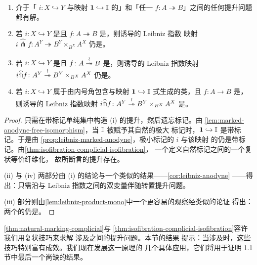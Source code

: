 \begin{proposition}\label{prop:leibniz-stability-isofibrations}
\begin{enumerate}[label=(\roman*)]
\item 介于「\trMonomorphism{} $i\colon X\hookrightarrow Y$ 与映射
  $\mathbf{1}\hookrightarrow\mathbb{I}$ 的\trLeibnizProduct」和「任一\trIsofibration{}
  $f\colon A\twoheadrightarrow B$」之间的任何提升问题都有解。
\item 若 $i\colon X\hookrightarrow Y$ 是\trMonomorphism{}且
  $f\colon A\twoheadrightarrow B$ 是\trIsofibration，则诱导的 Leibniz 指数
  映射 $i\widehat{\pitchfork}f\colon A^{Y}\twoheadrightarrow B^{Y}\times_{B^{X}}A^{X}$ 仍是\trIsofibration。
\item 若 $i\colon X\hookrightarrow Y$ 是\trMonomorphism{}且
  $f\colon A\overset{\wr}{\twoheadrightarrow} B$ 是\trTrivialFibration，则诱导的 Leibniz 指数映射
  $i\widehat{\pitchfork}f\colon A^{Y}\overset{\wr}{\twoheadrightarrow} B^{Y}\times_{B^{X}}A^{X}$ 仍是\trTrivialFibration。
\item 若 $i\colon X\hookrightarrow Y$ 属于由内号角包含与映射
  $\mathbf{1}\hookrightarrow\mathbb{I}$ \trCell{}式生成的类，且 $f\colon A\to B$ 是\trIsofibration，
  则诱导的 Leibniz 指数映射
  $i\widehat{\pitchfork}f\colon A^{Y}\overset{\wr}{\twoheadrightarrow} B^{Y}\times_{B^{X}}A^{X}$ 是\trTrivialFibration。
\end{enumerate}
\end{proposition}

\begin{proof}
只需在带标记单纯集中构造 (i) 的提升，然后遗忘标记。由%
\cref{lem:marked-anodyne-free-isomorphism}，当 $\mathbb{I}$ 被赋予其自然的极大
标记时，$\mathbf{1}\hookrightarrow\mathbb{I}$ 是带标记\trAnodyneExtension。于是由%
\cref{prop:leibniz-marked-anodyne}，极小标记的\trMonomorphism{} $i$ 与该映射
的\trLeibnizProduct{}仍是带标记\trAnodyneExtension。由\cref{thm:isofibration-complicial-isofibration}，
一个\trIsofibration{}定义自然标记\trQuasiCategory{}之间的一个复状等价纤维化，
故所断言的提升存在。

(ii) 与 (iv) 两部分由 (i) 的结论与一个类似的结果——\cref{cor:leibniz-anodyne}
——得出：只需沿\trLeibnizProduct{}与 Leibniz 指数之间的双变量伴随转置提升问题。

(iii) 部分则由\cref{lem:leibniz-product-mono}中一个更容易的观察经类似的论证
得出：两个\trMonomorphism{}的\trLeibnizProduct{}仍是\trMonomorphism。
\end{proof}

\cref{thm:natural-marking-complicial}与%
\cref{thm:isofibration-complicial-isofibration}容许我们用复状技巧来求解
涉及\trQuasiCategory{}之间\trIsofibration{}的提升问题。本节的结果
提示：当涉及\trIsomorphism{}时，这些技巧特别富有成效。我们现在发展这一原理的
几个具体应用，它们将用于证明 1.1 节中最后一个尚缺的结果。

